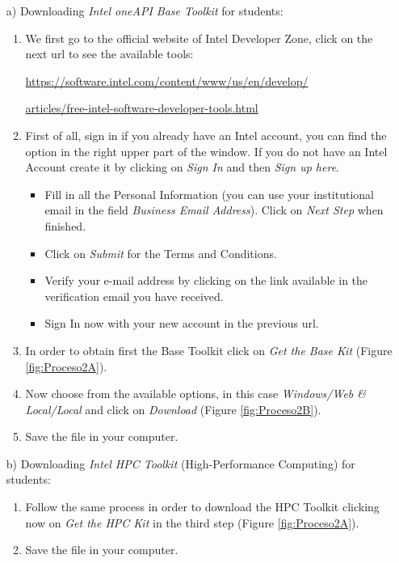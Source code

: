 \newpage
\begin{itemize}
    \item[a)] Downloading \textit{Intel\hspace{0.04cm}\textregistered\hspace{0.05cm} oneAPI Base Toolkit} for students:
    \begin{enumerate}
        \item We first go to the official website of Intel Developer Zone, click on the next url to see the available tools:
   
        \url{https://software.intel.com/content/www/us/en/develop/}
        
        \url{articles/free-intel-software-developer-tools.html}
        
        \item First of all, sign in if you already have an Intel account, you can find the option in the right upper part of the window. If you do not have an Intel Account create it by clicking on \textit{Sign In} and then \textit{Sign up here}.
            \begin{itemize}
                \item Fill in all the Personal Information (you can use your institutional email in the field \textit{Business Email Address}). Click on \textit{Next Step} when finished.
                \item Click on \textit{Submit} for the Terms and Conditions.
                \item Verify your e-mail address by clicking on the link available in the verification email you have received.
                \item Sign In now with your new account in the previous url. 
            \end{itemize}
        \item In order to obtain first the Base Toolkit click on \textit{Get the Base Kit} (Figure \ref{fig:Proceso2A}).
        \item Now choose from the available options, in this case \textit{Windows/Web \& Local/Local} and click on \textit{Download} (Figure \ref{fig:Proceso2B}).
        \item Save the file in your computer.
    \end{enumerate}   
    
    \item[b)] Downloading \textit{Intel\hspace{0.04cm}\textregistered\hspace{0.05cm} HPC Toolkit} (High-Performance Computing) for students:   
    \begin{enumerate}
        \item Follow the same process in order to download the HPC Toolkit clicking now on \textit{Get the HPC Kit} in the third step (Figure \ref{fig:Proceso2A}).
        \item Save the file in your computer.
    \end{enumerate} 


\end{itemize}
